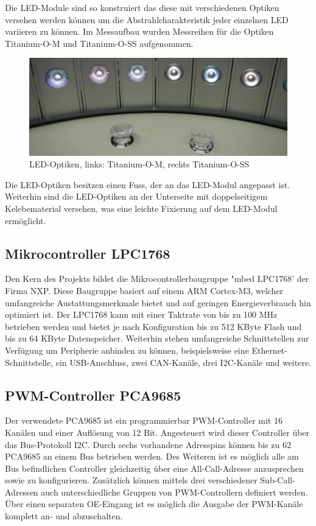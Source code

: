 \documentclass[a4paper,12pt]{scrartcl}
\begin{document}
Die LED-Module sind so konstruiert das diese mit verschiedenen Optiken versehen werden k\"onnen um die Abstrahlcharakteristik jeder einzelnen LED variieren zu k\"onnen. Im Messaufbau wurden Messreihen f\"ur die Optiken Titanium-O-M und Titanium-O-SS aufgenommen.
\begin{figure}[htb]
\begin{center}
  \includegraphics[width=1\hsize]{./images/foto_hardware_optiken.png}
\end{center}
\caption{\label{fotohwoptiken}LED-Optiken, links: Titanium-O-M, rechts Titanium-O-SS}
\end{figure}
Die LED-Optiken besitzen einen Fuss, der an das LED-Modul angepasst ist. Weiterhin sind die LED-Optiken an der Unterseite mit doppelseitigem Kelebematerial versehen, was eine leichte Fixierung auf dem LED-Modul ermöglicht.

\subsection{Mikrocontroller LPC1768}
Den Kern des Projekts bildet die Mikrocontrollerbaugruppe "mbed LPC1768' der Firma NXP. Diese Baugruppe basiert auf einem ARM Cortex-M3, welcher umfangreiche Austattungsmerkmale bietet und auf geringen Energieverbrauch hin optimiert ist.
Der LPC1768 kann mit einer Taktrate von bis zu 100 MHz betrieben werden und bietet je nach Konfiguration bis zu 512 KByte Flash und bis zu 64 KByte Datenspeicher. Weiterhin stehen umfangreiche Schnittstellen zur Verfügung um
Peripherie anbinden zu können, beispielsweise eine Ethernet-Schnittstelle, ein USB-Anschluss, zwei CAN-Kanäle, drei I2C-Kanäle und weitere. \cite{speclpc1768}

\subsection{PWM-Controller PCA9685}
\label{sec:hardwarePWM}
Der verwendete PCA9685 ist ein programmierbar PWM-Controller mit 16 Kanälen und einer Auflösung von 12 Bit. Angesteuert wird dieser Controller über das Bus-Protokoll I2C. Durch sechs vorhandene Adresspins können bis zu 62 PCA9685 an einem Bus betrieben werden. Des Weiteren ist es möglich alle am Bus befindlichen Controller gleichzeitig über eine All-Call-Adresse anzusprechen sowie zu konfigurieren. Zusätzlich können mittels drei verschiedener Sub-Call-Adressen auch unterschiedliche Gruppen von PWM-Controllern definiert werden. Über einen separaten OE-Eingang ist es möglich die Ausgabe der PWM-Kanäle komplett an- und abzuschalten.
\end{document}
